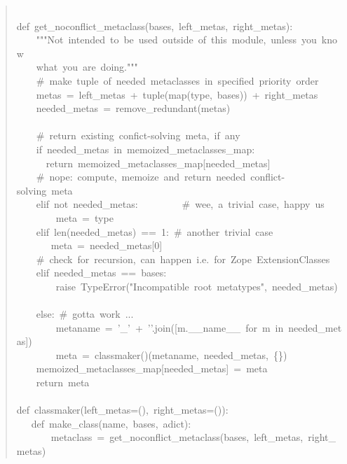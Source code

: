 \documentclass[10pt,a4paper,english]{article}
\begin{document}
\begin{quote}
{~\\
def~get{\_}noconflict{\_}metaclass(bases,~left{\_}metas,~right{\_}metas):~\\
~~~~"{}"{}"Not~intended~to~be~used~outside~of~this~module,~unless~you~know~\\
~~~~what~you~are~doing."{}"{}"~\\
~~~~{\#}~make~tuple~of~needed~metaclasses~in~specified~priority~order~\\
~~~~metas~=~left{\_}metas~+~tuple(map(type,~bases))~+~right{\_}metas~\\
~~~~needed{\_}metas~=~remove{\_}redundant(metas)~\\
~\\
~~~~{\#}~return~existing~confict-solving~meta,~if~any~\\
~~~~if~needed{\_}metas~in~memoized{\_}metaclasses{\_}map:~\\
~~~~~~return~memoized{\_}metaclasses{\_}map{[}needed{\_}metas]~\\
~~~~{\#}~nope:~compute,~memoize~and~return~needed~conflict-solving~meta~\\
~~~~elif~not~needed{\_}metas:~~~~~~~~~{\#}~wee,~a~trivial~case,~happy~us~\\
~~~~~~~~meta~=~type~\\
~~~~elif~len(needed{\_}metas)~==~1:~{\#}~another~trivial~case~\\
~~~~~~~meta~=~needed{\_}metas{[}0]~\\
~~~~{\#}~check~for~recursion,~can~happen~i.e.~for~Zope~ExtensionClasses~\\
~~~~elif~needed{\_}metas~==~bases:~~\\
~~~~~~~~raise~TypeError("Incompatible~root~metatypes",~needed{\_}metas)~\\
~~~~else:~{\#}~gotta~work~...~\\
~~~~~~~~metaname~=~'{\_}'~+~'{}'.join({[}m.{\_}{\_}name{\_}{\_}~for~m~in~needed{\_}metas])~\\
~~~~~~~~meta~=~classmaker()(metaname,~needed{\_}metas,~{\{}{\}})~\\
~~~~memoized{\_}metaclasses{\_}map{[}needed{\_}metas]~=~meta~\\
~~~~return~meta~\\
~\\
def~classmaker(left{\_}metas=(),~right{\_}metas=()):~\\
~~~def~make{\_}class(name,~bases,~adict):~\\
~~~~~~~metaclass~=~get{\_}noconflict{\_}metaclass(bases,~left{\_}metas,~right{\_}metas)~\\
}
\end{quote}
\end{document}
